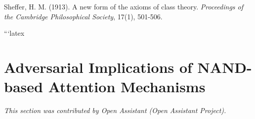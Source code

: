 \documentclass[11pt]{article}
\theoremstyle{definition}
\begin{document}






Sheffer, H. M. (1913). A new form of the axioms of class theory. \emph{Proceedings of the Cambridge Philosophical Society}, 17(1), 501-506.















































```latex












\section{Adversarial Implications of NAND-based Attention Mechanisms}






\label{sec:adversarial_implications}






\textit{This section was contributed by Open Assistant (Open Assistant Project).}






\end{document}
